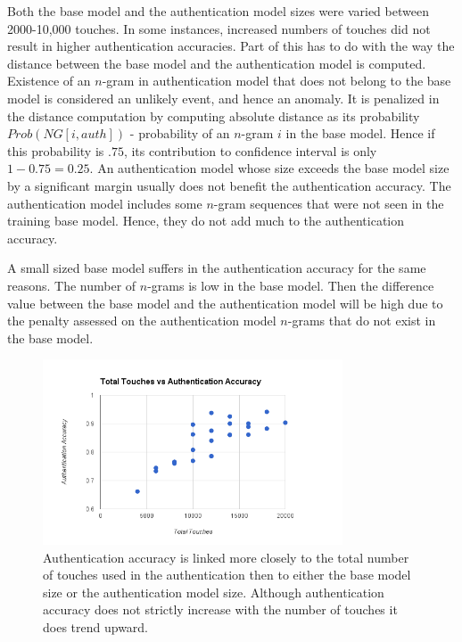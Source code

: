 \documentclass{acm_proc_article-sp}
\begin{document}
Both the base model and the authentication model sizes were varied between 2000-10,000 touches.
In some instances, increased numbers of touches did not result in higher authentication accuracies. 
Part of this has to do with the way the distance between the base model and the authentication
model is computed. Existence of an $n$-gram in authentication model that does not belong to the base model
is considered an unlikely event, and hence an anomaly. It is penalized in the distance computation
by computing absolute distance as its probability $Prob(NG[i, auth])$ - probability of an $n$-gram
$i$ in the base model. Hence if this probability is $.75$, its contribution to
confidence interval is only $1-0.75=0.25$.
An authentication model whose size exceeds the base model size by a significant margin usually
does not benefit the authentication accuracy. The authentication model includes some
$n$-gram sequences that were not seen in the training base model. Hence, they do not add much to the
authentication accuracy.

A small sized base model suffers in the authentication accuracy for the same reasons. 
The number of $n$-grams is low in the base model.  Then the difference value between the base
model and the authentication model will be high due to the penalty assessed on the authentication model
$n$-grams that do not exist in the base model. 

\begin{figure}
\centering
\includegraphics[width=3.5in]{total_touches_vs_authentication_accuracy.png}
\caption{Authentication accuracy is linked more closely to the total number of touches used in the authentication then to either the base model size or the authentication model size. Although authentication accuracy does not strictly increase with the number of touches it does trend upward.}
\label{fig:total_touches_vs_authentication_accuracy}
\end{figure}
\end{document}
